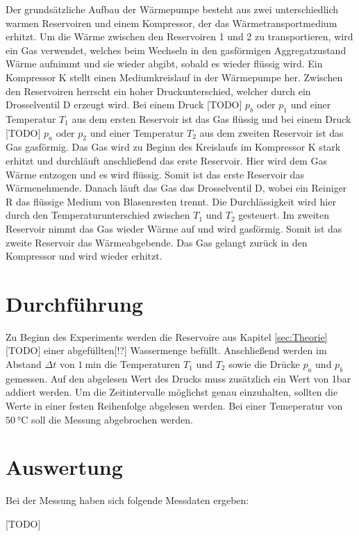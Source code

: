     Der grundsätzliche Aufbau der Wärmepumpe besteht aus zwei unterschiedlich warmen Reservoiren und einem Kompressor,
    der das Wärmetransportmedium erhitzt.
    Um die Wärme zwischen den Reservoiren 1 und 2 zu transportieren, wird ein Gas verwendet, welches beim Wechseln in den gasförmigen
    Aggregatzustand Wärme aufnimmt und sie wieder abgibt, sobald es wieder flüssig wird.
    Ein Kompressor K stellt einen Mediumkreislauf in der Wärmepumpe her.
    Zwischen den Reservoiren herrscht ein hoher Druckunterschied, welcher durch ein Drosselventil D erzeugt wird.
    Bei einem Druck [TODO] $p_b$ oder $p_1$ und einer Temperatur $T_1$ aus dem ersten Reservoir ist das Gas flüssig und bei einem Druck [TODO] $p_a$ oder $p_2$
    und einer Temperatur $T_2$ aus dem zweiten Reservoir ist das Gas gasförmig.
    Das Gas wird zu Beginn des Kreislaufs im Kompressor K stark erhitzt und durchläuft anschließend das erste Reservoir.
    Hier wird dem Gas Wärme entzogen und es wird flüssig. Somit ist das erste Reservoir das Wärmenehmende.
    Danach läuft das Gas das Drosselventil D, wobei ein Reiniger R das flüssige Medium von Blasenresten trennt.
    Die Durchlässigkeit wird hier durch den Temperaturunterschied zwischen $T_1$ und $T_2$ gesteuert.
    Im zweiten Reservoir nimmt das Gas wieder Wärme auf und wird gasförmig. Somit ist das zweite Reservoir das Wärmeabgebende.
    Das Gas gelangt zurück in den Kompressor und wird wieder erhitzt.


\section{Durchführung} \label{sec:Durchführung}
    Zu Beginn des Experiments werden die Reservoire aus Kapitel \ref{sec:Theorie} [TODO] einer abgefüllten[!?] Wassermenge befüllt.
    Anschließend werden im Abstand $\Delta t$ von $\SI{1}{\minute}$ die Temperaturen $T_1$ und $T_2$ sowie die Drücke $p_a$ und $p_b$ gemessen.
    Auf den abgelesen Wert des Drucks muss zusätzlich ein Wert von 1bar addiert werden.
    Um die Zeitintervalle möglichst genau einzuhalten, sollten die Werte in einer festen Reihenfolge abgelesen werden.
    Bei einer Temeperatur von $\SI{50}{\celsius}$ soll die Messung abgebrochen werden.

\section{Auswertung} \label{sec:Auswertung}
    Bei der Messung haben sich folgende Messdaten ergeben:

    [TODO]


